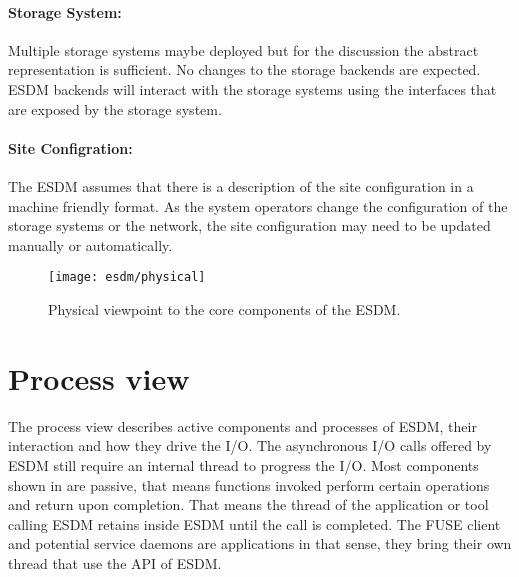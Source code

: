 \paragraph{Storage System:} Multiple storage systems maybe deployed but for the discussion the abstract representation is sufficient.
No changes to the storage backends are expected.
ESDM backends will interact with the storage systems using the interfaces that are exposed by the storage system.

\paragraph{Site Configration:} The ESDM assumes that there is a description of the site configuration in a machine friendly format. As the system operators change the configuration of the storage systems or the network, the site configuration may need to be updated manually or automatically.




\begin{figure}
	\centering
	\texttt{[image: esdm/physical]}
	\caption{Physical viewpoint to the core components of the ESDM.}
	\label{fig:viewpoint physical}
\end{figure}














\section{Process view}
\label{sec: viewpoints/process}

The process view describes active components and processes of ESDM, their interaction and how they drive the I/O.
The asynchronous I/O calls offered by ESDM still require an internal thread to progress the I/O.
Most components shown in  are passive, that means functions invoked perform certain operations and return upon completion.
That means the thread of the application or tool calling ESDM retains inside ESDM until the call is completed.
The FUSE client and potential service daemons are applications in that sense, they bring their own thread that use the API of ESDM.

